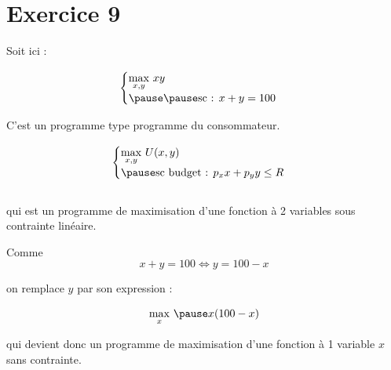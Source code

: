 \documentclass[9pt,handout,professionalfonts,hyperref]{beamer}
\begin{document}
\section{Exercice 9}

\begin{frame}

Soit ici : \newline 

\[\begin{aligned}
\begin{cases}
\underset{x,y}{\max}~xy \\
\pause \pause \text{sc : } x + y =100
\end{cases}
\end{aligned}\]\newline 

\pause C'est un programme type programme du consommateur. 

\[\begin{aligned}
\begin{cases}
\underset{x,y}{\max}~U(x,y) \\
\pause \text{sc budget : } p_xx + p_yy \le R
\end{cases}
\end{aligned}\]\\

qui est un programme de maximisation d'une fonction à 2 variables sous contrainte linéaire.  
\end{frame}

\begin{frame}

Comme 
$$
x+y=100  \Leftrightarrow y=100-x
$$

\pause on remplace $y$ par son expression :

\[\begin{aligned}
\underset{x}{\max}~\pause x(100-x) 
\end{aligned}\]

\pause qui devient donc un programme de maximisation d'une fonction à 1 variable $x$ sans contrainte.

\end{frame}
\end{document}
